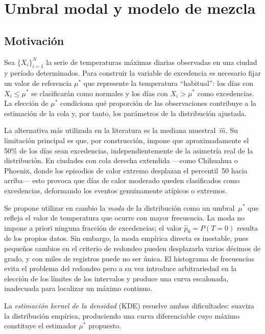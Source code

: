 \documentclass[APA,STIX1COL]{WileyNJD-v2}
\begin{document}
{%
\section{Umbral modal y modelo de mezcla}\label{sec:threshold}

\subsection{Motivación}

Sea $\{X_i\}_{i=1}^{N}$ la serie de temperaturas m\'aximas diarias
observadas en una ciudad y per\'iodo determinados. Para construir
la variable de excedencia es necesario fijar un valor de referencia
$\mu^*$ que represente la temperatura ``habitual'': los d\'ias con
$X_i\leq\mu^*$ se clasificar\'an como normales y los d\'ias con
$X_i>\mu^*$ como excedencias. La elecci\'on de $\mu^*$ condiciona qu\'e proporci\'on
de las observaciones contribuye a la estimaci\'on de la cola y, por
tanto, los par\'ametros de la distribuci\'on ajustada.

La alternativa más utilizada en la literatura es la mediana
muestral~$\hat{m}$. Su limitación principal es que, por construcción, impone que aproximadamente el 50\% de los días sean excedencias,
independientemente de la asimetría real de la distribución. En
ciudades con cola derecha extendida ---como Chihuahua o Phoenix, donde
los episodios de calor extremo desplazan el percentil~50 hacia
arriba--- esto provoca que días de calor moderado queden
clasificados como excedencias, deformando los eventos genuinamente atípicos o extremos.

Se propone utilizar en cambio la \emph{moda} de la distribución como un
umbral~$\mu^*$ que refleja el valor de temperatura que ocurre con mayor
frecuencia. La moda no impone a priori ninguna fracción de
excedencias; el valor $\hat{p}_0 = P(T=0)$ resulta de los propios
datos. Sin embargo, la moda empírica directa es inestable, pues pequeños
cambios en el criterio de redondeo pueden desplazarla varios décimos de
grado, y con miles de registros puede no ser única. El histograma de
frecuencias evita el problema del redondeo pero a su vez introduce arbitrariedad
en la elección de los límites de los intervalos y produce una curva
escalonada, inadecuada para localizar un máximo continuo.

La \emph{estimación kernel de la densidad} (KDE) resuelve ambas
dificultades: suaviza la distribución empírica, produciendo una curva diferenciable cuyo máximo constituye el estimador $\mu^*$ propuesto.

}
\end{document}
